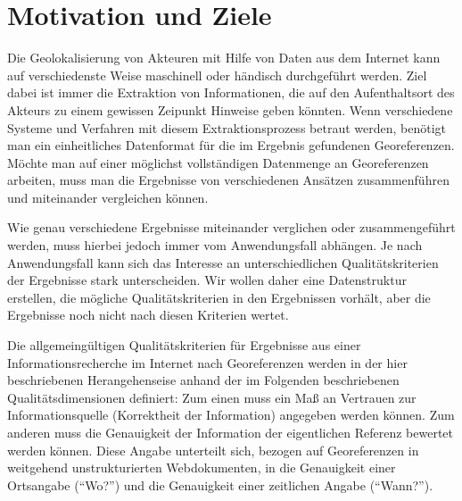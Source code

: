 \section{Motivation und Ziele}

Die Geolokalisierung von Akteuren mit Hilfe von Daten aus dem Internet kann auf verschiedenste Weise maschinell oder händisch durchgeführt werden. Ziel dabei ist immer die Extraktion von Informationen, die auf den Aufenthaltsort des Akteurs zu einem gewissen Zeipunkt Hinweise geben könnten. Wenn verschiedene Systeme und Verfahren mit diesem Extraktionsprozess betraut werden, benötigt man ein einheitliches Datenformat für die im Ergebnis gefundenen Georeferenzen. Möchte man auf einer möglichst vollständigen Datenmenge an Georeferenzen arbeiten, muss man die Ergebnisse von verschiedenen Ansätzen zusammenführen und miteinander vergleichen können.

Wie genau verschiedene Ergebnisse miteinander verglichen oder zusammengeführt werden, muss hierbei jedoch immer vom Anwendungsfall abhängen. Je nach Anwendungsfall kann sich das Interesse an unterschiedlichen Qualitätskriterien der Ergebnisse stark unterscheiden. Wir wollen daher eine Datenstruktur erstellen, die mögliche Qualitätskriterien in den Ergebnissen vorhält, aber die Ergebnisse noch nicht nach diesen Kriterien wertet.

Die allgemeingültigen Qualitätskriterien für Ergebnisse aus einer Informationsrecherche im Internet nach Georeferenzen werden in der hier beschriebenen Herangehenseise anhand der im Folgenden beschriebenen Qualitätsdimensionen definiert: Zum einen muss ein Maß an Vertrauen zur Informationsquelle (Korrektheit der Information) angegeben werden können. Zum anderen muss die Genauigkeit der Information der eigentlichen Referenz bewertet werden können. Diese Angabe unterteilt sich, bezogen auf Georeferenzen in weitgehend unstrukturierten Webdokumenten, in die Genauigkeit einer Ortsangabe (``Wo?'') und die Genauigkeit einer zeitlichen Angabe (``Wann?'').
